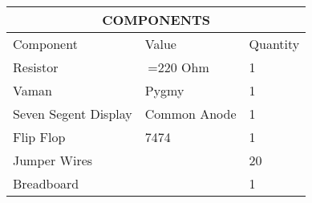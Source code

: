 \begin{tabular}{|p{5cm}|p{3cm}|p{2cm}|}
\hline
\multicolumn{3}{|c|}{COMPONENTS}\\
\hline
Component& Value& Quantity\\
\hline
Resistor& $\>$=220 Ohm& 1\\
\hline
Vaman & Pygmy & 1\\
\hline
Seven Segent Display& Common Anode& 1\\
\hline
Flip Flop& 7474& 1\\
\hline
Jumper Wires&  & 20\\
\hline
Breadboard&  & 1\\
\hline
\end{tabular}
